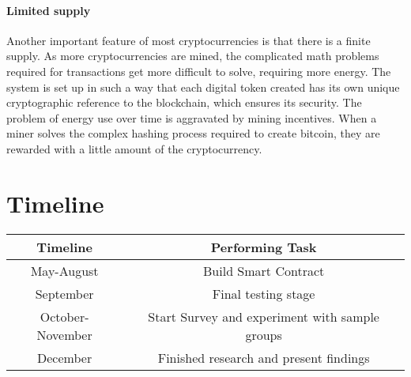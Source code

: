 \documentclass[10pt,twocolumn]{article}
\begin{document}
\paragraph{Limited supply}

Another important feature of most cryptocurrencies is that there is a finite supply. As more cryptocurrencies are mined, the complicated math problems required for transactions get more difficult to solve, requiring more energy.\cite{Bariviera} The system is set up in such a way that each digital token created has its own unique cryptographic reference to the blockchain, which ensures its security. The problem of energy use over time is aggravated by mining incentives. When a miner solves the complex hashing process required to create bitcoin, they are rewarded with a little amount of the cryptocurrency.

\section{Timeline}

    \begin{tabular} { | c | c | }
    \hline
     Timeline & Performing Task \\
    \hline
    May-August & Build Smart Contract\\
    \hline
    September & Final testing stage\\
    \hline
    October-November & Start Survey and experiment with sample groups\\
    \hline
    December & Finished research and present findings\\
    \hline
    \end{tabular}


\printbibliography
\end{document}
